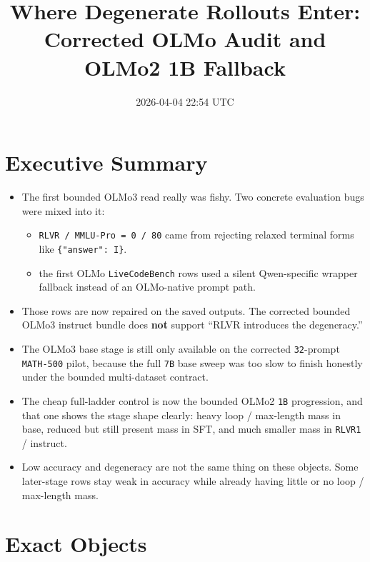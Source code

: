 \documentclass[11pt]{article}
\title{Where Degenerate Rollouts Enter: Corrected OLMo Audit and OLMo2 1B Fallback}
\author{}
\date{2026-04-04 22:54 UTC}
\begin{document}
\maketitle

\section*{Executive Summary}
\begin{itemize}[leftmargin=1.5em]
\item The first bounded OLMo3 read really was fishy. Two concrete evaluation bugs were mixed into it:
  \begin{itemize}[leftmargin=1.5em]
  \item \texttt{RLVR / MMLU-Pro = 0 / 80} came from rejecting relaxed terminal forms like \verb|{"answer": I}|.
  \item the first OLMo \texttt{LiveCodeBench} rows used a silent Qwen-specific wrapper fallback instead of an OLMo-native prompt path.
  \end{itemize}
\item Those rows are now repaired on the saved outputs. The corrected bounded OLMo3 instruct bundle does \textbf{not} support ``RLVR introduces the degeneracy.''
\item The OLMo3 base stage is still only available on the corrected \texttt{32}-prompt \texttt{MATH-500} pilot, because the full \texttt{7B} base sweep was too slow to finish honestly under the bounded multi-dataset contract.
\item The cheap full-ladder control is now the bounded OLMo2 \texttt{1B} progression, and that one shows the stage shape clearly: heavy loop / max-length mass in base, reduced but still present mass in SFT, and much smaller mass in \texttt{RLVR1} / instruct.
\item Low accuracy and degeneracy are not the same thing on these objects. Some later-stage rows stay weak in accuracy while already having little or no loop / max-length mass.
\end{itemize}

\section*{Exact Objects}
\end{document}

